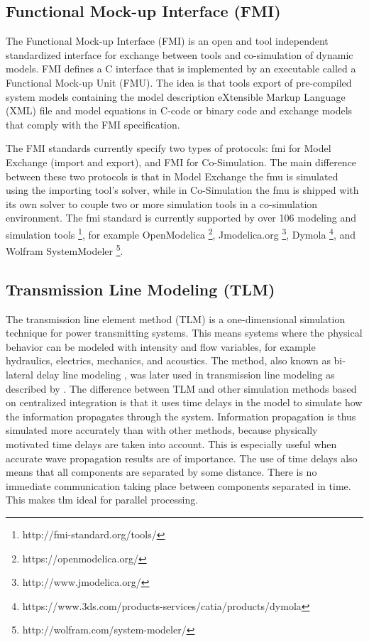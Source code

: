 \subsection{Functional Mock-up Interface (FMI)}
\label{sec:fmi}

The Functional Mock-up Interface (FMI) \cite{fmi,fmiblochwitz} is an open and tool independent standardized interface for exchange between tools and co-simulation of dynamic models. FMI defines a C interface that is implemented by an executable called a Functional Mock-up Unit (FMU). The idea is that tools export of pre-compiled system models containing the model description  eXtensible Markup Language (XML) file and model equations in C-code or binary code and exchange models that comply with the FMI specification. 

The FMI standards currently specify two types of protocols: \acrshort{fmi} for Model Exchange (import and export), and FMI for Co-Simulation. The main difference between these two protocols is that in Model Exchange the \acrshort{fmu} is simulated using the importing tool's solver, while in Co-Simulation the \acrshort{fmu} is shipped with its own solver to couple two or more simulation tools in a co-simulation environment. 
The \acrshort{fmi} standard is currently supported by over 106 modeling and simulation tools \footnote{http://fmi-standard.org/tools/}, for example  OpenModelica \footnote{https://openmodelica.org/}, Jmodelica.org \footnote{http://www.jmodelica.org/}, Dymola \footnote{https://www.3ds.com/products-services/catia/products/dymola}, and Wolfram SystemModeler \footnote{http://wolfram.com/system-modeler/}.

\subsection{Transmission Line Modeling (TLM)}
\label{sec:tlm}

The transmission line element method (TLM) \cite{tlmkurs90,tlmkurs99,tlmcogan,tlmjohns} is a one-dimensional simulation technique for power transmitting systems. This means systems where the physical behavior can be modeled with intensity and flow variables, for example hydraulics, electrics, mechanics, and acoustics. The method, also known as bi-lateral delay line modeling \cite{tlmauslander}, was later used in transmission line modeling as described by \cite{tlmjohns}. The difference between TLM and other simulation methods based on centralized integration is that it uses time delays in the model to simulate how the information propagates through the system. Information propagation is thus simulated more accurately than with other methods, because physically motivated time delays are taken into account. This is especially useful when accurate wave propagation results are of importance. The use of time delays also means that all components are separated by some distance. There is no immediate communication taking place between components separated in time. This makes \acrshort{tlm} ideal for parallel processing.

